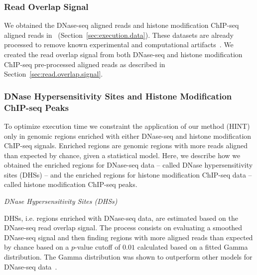 \subsubsection{Read Overlap Signal}

We obtained the DNase-seq aligned reads and histone modification ChIP-seq aligned reads in~\cite{encode2012} (Section~\ref{sec:execution.data}). These datasets are already processed to remove known experimental and computational artifacts~\citep{encode2012,derrien2012,ashoor2013,diaz2012}. We created the read overlap signal from both DNase-seq and histone modification ChIP-seq pre-processed aligned reads as described in Section~\ref{sec:read.overlap.signal}.

\subsubsection{DNase Hypersensitivity Sites and Histone Modification ChIP-seq Peaks}

To optimize execution time we constraint the application of our method (HINT) only in genomic regions enriched with either DNase-seq and histone modification ChIP-seq signals. Enriched regions are genomic regions with more reads aligned than expected by chance, given a statistical model. Here, we describe how we obtained the enriched regions for DNase-seq data -- called DNase hypersensitivity sites (DHSs) -- and the enriched regions for histone modification ChIP-seq data -- called histone modification ChIP-seq peaks.

\vspace{0.5cm}
\noindent
\emph{DNase Hypersensitivity Sites (DHSs)}
\vspace{0.3cm}

\noindent
DHSs, i.e. regions enriched with DNase-seq data, are estimated based on the DNase-seq read overlap signal. The process consists on evaluating a smoothed DNase-seq signal and then finding regions with more aligned reads than expected by chance based on a $p$-value cutoff of $0.01$ calculated based on a fitted Gamma distribution. The Gamma distribution was shown to outperform other models for DNase-seq data~\citep{boyle2008b}.

